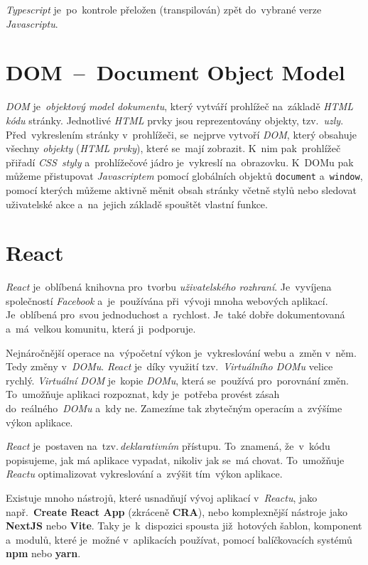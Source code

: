 \documentclass[11pt,a4paper]{report}
\begin{document}
            \emph{Typescript} je~po~kontrole přeložen (transpilován) zpět do~vybrané verze \emph{Javascriptu}. \cite[Get started/TypeScript for the New Programmer]{TypeScript}

        \section{DOM~--~Document Object Model}
            \emph{DOM} je~\emph{objektový model dokumentu}, který vytváří prohlížeč na~základě \emph{HTML kódu} stránky. Jednotlivé \emph{HTML} prvky jsou reprezentovány objekty, tzv.~\emph{uzly}. Před~vykreslením stránky v~prohlížeči, se~nejprve vytvoří \emph{DOM}, který obsahuje všechny \emph{objekty} (\emph{HTML prvky}), které se~mají zobrazit. K~nim pak~prohlížeč přiřadí \emph{CSS~styly} a~prohlížečové jádro je~vykreslí na~obrazovku. K~DOMu pak můžeme přistupovat \emph{Javascriptem} pomocí globálních objektů \texttt{document} a~\texttt{window}, pomocí kterých můžeme aktivně měnit obsah stránky včetně stylů nebo sledovat uživatelské akce a~na~jejich základě spouštět vlastní funkce.\cite[2.1.01]{kantor_javascript}
        
        \section{React}
            \emph{React} je~oblíbená knihovna pro~tvorbu \emph{uživatelského rozhraní}. Je~vyvíjena společností \emph{Facebook} a~je~používána při~vývoji mnoha webových aplikací. Je~oblíbená pro~svou jednoduchost a~rychlost. Je~také dobře dokumentovaná a~má~velkou komunitu, která ji~podporuje.
            
            Nejnáročnější operace na~výpočetní výkon je~vykreslování webu a~změn v~něm. Tedy změny v~\emph{DOMu}. \emph{React} je~díky využití tzv.~\emph{Virtuálního DOMu} velice rychlý. \emph{Virtuální DOM} je~kopie \emph{DOMu}, která se~používá pro~porovnání změn. To~umožňuje aplikaci rozpoznat, kdy je~potřeba provést zásah do~reálného~\emph{DOMu} a~kdy ne. Zamezíme tak zbytečným operacím a~zvýšíme výkon aplikace. \cite{elrom2021react}
            
            \emph{React} je~postaven na~tzv.\,\emph{deklarativním} přístupu. To~znamená, že~v~kódu popisujeme, jak má aplikace vypadat, nikoliv jak se~má chovat. To~umožňuje \emph{Reactu} optimalizovat vykreslování a~zvýšit tím~výkon aplikace.
            
            Existuje mnoho nástrojů, které usnadňují vývoj aplikací v~\emph{Reactu}, jako např.~\textbf{Create React App} (zkráceně \textbf{CRA}), nebo komplexnější nástroje jako \textbf{NextJS} nebo \textbf{Vite}. Taky je~k~dispozici spousta již~hotových šablon, komponent a~modulů, které je~možné v~aplikacích používat, pomocí balíčkovacích systémů \textbf{npm} nebo \textbf{yarn}.
\end{document}
